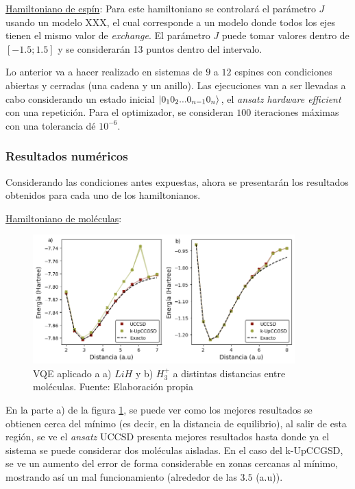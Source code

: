 \underline{Hamiltoniano de espín}: 
Para este hamiltoniano se controlará el parámetro $J$ usando un modelo XXX, el cual corresponde a un modelo donde todos los ejes tienen el mismo valor de \textit{exchange}. El parámetro $J$ puede tomar valores dentro de $[-1.5; 1.5]$ y se considerarán 13 puntos dentro del intervalo. 

Lo anterior va a hacer realizado en sistemas de $9$ a $12$ espines con condiciones abiertas y cerradas (una cadena y un anillo). Las ejecuciones van a ser llevadas a cabo considerando un estado inicial $\ket{0_10_2...0_{n-1}0_n}$, el \textit{ansatz hardware efficient} con una repetición. Para el optimizador, se consideran $100$ iteraciones máximas con una tolerancia dé $10^{-6}$.


\subsubsection{Resultados numéricos}
Considerando las condiciones antes expuestas, ahora se presentarán los resultados obtenidos para cada uno de los hamiltonianos.

\underline{Hamiltoniano de moléculas}:

\begin{figure}[H]
\centering
\includegraphics[width=0.9\textwidth]{figures/S4/moleculas/barridomoleculas.png}
\caption{\label{fig:5} VQE aplicado a a) $LiH$ y b) $H_3^{+}$ a distintas distancias entre moléculas. Fuente: Elaboración propia} 
\end{figure}

En la parte a) de la figura \ref{fig:5}, se puede ver como los mejores resultados se obtienen cerca del mínimo (es decir, en la distancia de equilibrio), al salir de esta región, se ve el \textit{ansatz} UCCSD presenta mejores resultados hasta donde ya el sistema se puede considerar dos moléculas aisladas. En el caso del k-UpCCGSD, se ve un aumento del error de forma considerable en zonas cercanas al mínimo, mostrando así un mal funcionamiento (alrededor de las $3.5$ (a.u)).

